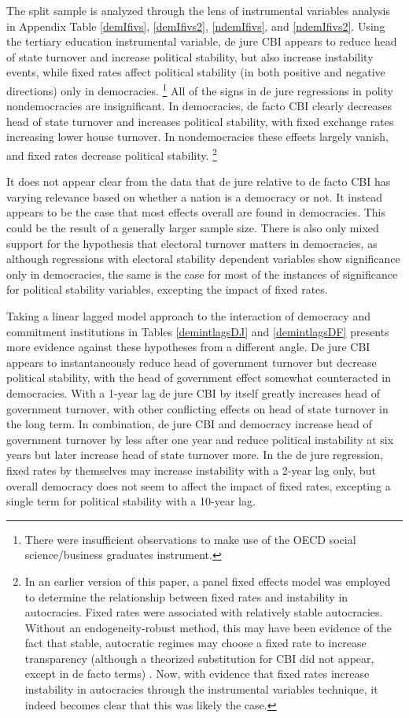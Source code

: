 \documentclass{article}
\begin{document}
    The split sample is analyzed through the lens of instrumental variables analysis in Appendix Table \ref*{demIfivs}, \ref*{demIfivs2}, \ref{ndemIfivs}, and \ref*{ndemIfivs2}. Using the tertiary education instrumental variable, de jure CBI appears to reduce head of state turnover and increase political stability, but also increase instability events, while fixed rates affect political stability (in both positive and negative directions) only in democracies. \footnote{There were insufficient observations to make use of the OECD social science/business graduates instrument.} All of the signs in de jure regressions in polity nondemocracies are insignificant. In democracies, de facto CBI clearly decreases head of state turnover and increases political stability, with fixed exchange rates increasing lower house turnover. In nondemocracies these effects largely vanish, and fixed rates decrease political stability. \footnote{In an earlier version of this paper, a panel fixed effects model was employed to determine the relationship between fixed rates and instability in autocracies. Fixed rates were associated with relatively stable autocracies. Without an endogeneity-robust method, this may have been evidence of the fact that stable, autocratic regimes may choose a fixed rate to increase transparency (although a theorized substitution for CBI did not appear, except in de facto terms) \citep{broz_political_2002}. Now, with evidence that fixed rates increase instability in autocracies through the instrumental variables technique, it indeed becomes clear that this was likely the case.}

    It does not appear clear from the data that de jure relative to de facto CBI has varying relevance based on whether a nation is a democracy or not. It instead appears to be the case that most effects overall are found in democracies. This could be the result of a generally larger sample size. There is also only mixed support for the hypothesis that electoral turnover matters in democracies, as although regressions with electoral stability dependent variables show significance only in democracies, the same is the case for most of the instances of significance for political stability variables, excepting the impact of fixed rates.

    Taking a linear lagged model approach to the interaction of democracy and commitment institutions in Tables \ref*{demintlagsDJ} and \ref*{demintlagsDF} presents more evidence against these hypotheses from a different angle. De jure CBI appears to instantaneously reduce head of government turnover but decrease political stability, with the head of government effect somewhat counteracted in democracies. With a 1-year lag de jure CBI by itself greatly increases head of government turnover, with other conflicting effects on head of state turnover in the long term. In combination, de jure CBI and democracy increase head of government turnover by less after one year and reduce political instability at six years but later increase head of state turnover more. In the de jure regression, fixed rates by themselves may increase instability with a 2-year lag only, but overall democracy does not seem to affect the impact of fixed rates, excepting a single term for political stability with a 10-year lag.
\end{document}
